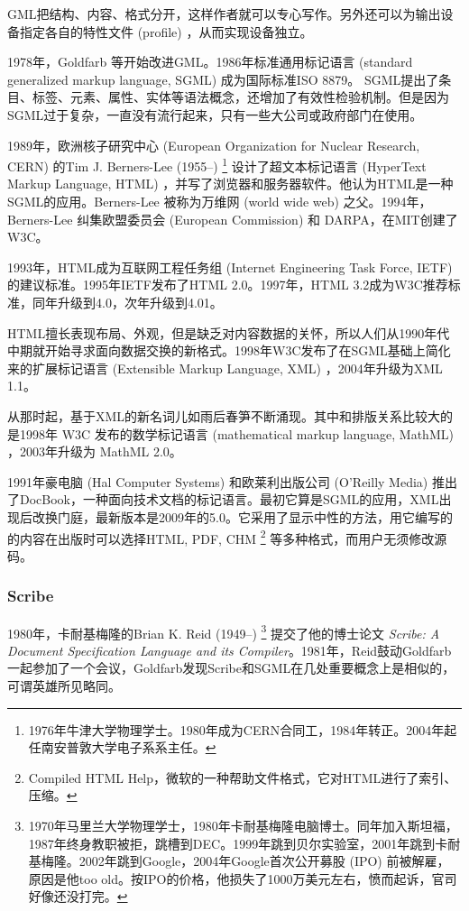 GML把结构、内容、格式分开，这样作者就可以专心写作。另外还可以为输出设备指定各自的特性文件 (profile) ，从而实现设备独立。

1978年，Goldfarb 等开始改进GML。1986年标准通用标记语言 (standard generalized markup language, SGML) 成为国际标准ISO 8879。 SGML提出了条目、标签、元素、属性、实体等语法概念，还增加了有效性检验机制。但是因为SGML过于复杂，一直没有流行起来，只有一些大公司或政府部门在使用。

1989年，欧洲核子研究中心 (European Organization for Nuclear Research, CERN)\indexCERN{} 的Tim J. Berners-Lee (1955--)\indexBernersLee{} \footnote{1976年牛津大学物理学士。1980年成为CERN合同工，1984年转正。2004年起任南安普敦大学电子系系主任。} 设计了超文本标记语言 (HyperText Markup Language, HTML) ，并写了浏览器和服务器软件。他认为HTML是一种SGML的应用。Berners-Lee 被称为万维网 (world wide web) 之父。1994年，Berners-Lee 纠集欧盟委员会 (European Commission) \indexEC 和 DARPA\indexDARPA，在MIT\indexMIT 创建了W3C\indexWWWC。

1993年，HTML成为互联网工程任务组 (Internet Engineering Task Force, IETF)\indexIETF{} 的建议标准。1995年IETF发布了HTML 2.0。1997年，HTML 3.2成为W3C推荐标准，同年升级到4.0，次年升级到4.01。

HTML擅长表现布局、外观，但是缺乏对内容数据的关怀，所以人们从1990年代中期就开始寻求面向数据交换的新格式。1998年W3C发布了在SGML基础上简化来的扩展标记语言 (Extensible Markup Language, XML) ，2004年升级为XML 1.1。

从那时起，基于XML的新名词儿如雨后春笋不断涌现。其中和排版关系比较大的是1998年  W3C 发布的数学标记语言 (mathematical markup language, MathML) ，2003年升级为 MathML 2.0。

1991年豪电脑 (Hal Computer Systems)\indexHal{} 和欧莱利出版公司 (O'Reilly Media)\indexOreilly{} 推出了DocBook，一种面向技术文档的标记语言。最初它算是SGML的应用，XML出现后改换门庭，最新版本是2009年的5.0。它采用了显示中性的方法，用它编写的的内容在出版时可以选择HTML, PDF, CHM \footnote{Compiled HTML Help，微软的一种帮助文件格式，它对HTML进行了索引、压缩。} 等多种格式，而用户无须修改源码。

\subsubsection{Scribe}

1980年，卡耐基梅隆的Brian K. Reid (1949--)\indexReid{} \footnote{1970年马里兰大学物理学士，1980年卡耐基梅隆电脑博士。同年加入斯坦福，1987年终身教职被拒，跳槽到DEC。1999年跳到贝尔实验室，2001年跳到卡耐基梅隆。2002年跳到Google，2004年Google首次公开募股 (IPO) 前被解雇，原因是他too old。按IPO的价格，他损失了1000万美元左右，愤而起诉，官司好像还没打完。} 提交了他的博士论文 \emph{Scribe: A Document Specification Language and its Compiler}。1981年，Reid鼓动Goldfarb一起参加了一个会议，Goldfarb发现Scribe和SGML在几处重要概念上是相似的，可谓英雄所见略同。

